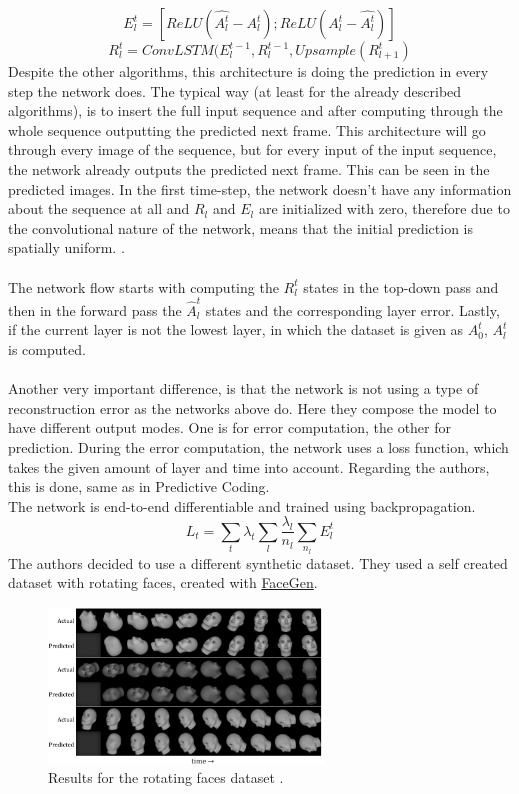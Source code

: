   \begin{equation}
   E_l^t = [ReLU(\hat{A_l^t} - A_l^t); ReLU(A_l^t - \hat{A_l^t})]
  \end{equation}
  \begin{equation}
   R_l^t = ConvLSTM(E_l^{t-1}, R_l^{t-1}, Upsample(R_{l+1}^t)
  \end{equation}\noindent
 Despite the other algorithms, this architecture is doing the prediction in every step the network does. The typical way (at least for the already described 
 algorithms), is to insert the full input sequence and after computing through the whole sequence outputting the predicted next frame. This architecture will go
 through every image of the sequence, but for every input of the input sequence, the network already outputs the predicted next frame. This can be seen in the
 predicted images. In the first time-step, the network doesn't have any information about the sequence at all and $R_l$ and $E_l$ are initialized with zero, 
 therefore \glqq [\ldots] due to the convolutional nature of the network, means that the initial prediction is spatially uniform.\grqq{} \cite{Lotter2016}.
 \\\\
 The network flow starts with computing the $R_l^t$ states in the top-down pass and then in the forward pass the $\hat{A}_l^t$ states and the corresponding
 layer error. Lastly, if the current layer is not the lowest layer, in which the dataset is given as $A_0^t$, $A_{l}^t$ is computed.
 \\\\
 Another very important difference, is that the network is not using a type of reconstruction error as the networks above do. Here they compose the model to
 have different output modes. One is for error computation, the other for prediction. During the error computation, the network uses a loss function, which takes
 the given amount of layer and time into account. Regarding the authors, this is done, same as in Predictive Coding.\\
 The network is end-to-end differentiable and trained using backpropagation.
 \begin{equation}
  L_t = \sum_{t}\lambda_t \sum_l \frac{\lambda_l}{n_l} \sum_{n_l}E_l^t
 \end{equation}
 The authors decided to use a different synthetic dataset. They used a self created dataset with rotating faces, created with \href{https://facegen.com/}
 {FaceGen}.
 \begin{figure}[H]
   \includegraphics[width=0.65\textwidth]{../Images/prednet.png}
   \centering
   \caption{Results for the rotating faces dataset \cite{Lotter2016}.}
   \label{fig:lotter_rotation}
 \end{figure}\noindent
